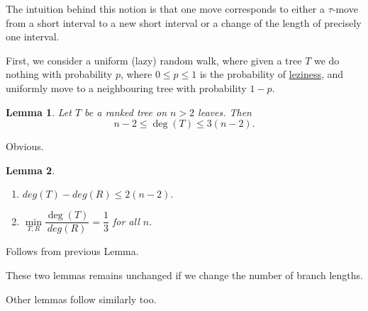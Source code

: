 \documentclass{amsart}
\newtheorem{lemma}{Lemma}
\begin{document}
The intuition behind this notion is that one move corresponds to either 
a $\tau$-move from a short interval to a new short interval or a change of the length of 
precisely one interval. 

First, we consider a uniform (lazy) random walk, where given a tree $T$ we do nothing 
with probability $p$, where $0\leq p\leq 1$ is the probability of \href{https://academichelp.net/wp-content/uploads/2014/01/laziness.jpg}{leziness}, and uniformly move to a neighbouring tree with probability $1-p$. 

\begin{lemma}
Let $T$ be a ranked tree on $n>2$ leaves. Then \[n-2\leq \deg(T)\leq3(n-2).\] 
\end{lemma}

\proof
Obvious.
\endproof

\begin{lemma}
\begin{enumerate}[(1)]
\item $deg(T)-deg(R) \leq 2(n-2).$
\item $\min\limits_{T,R}\dfrac{\deg(T)}{deg(R)} = \dfrac13$ for all $n.$
\end{enumerate}
\end{lemma}

\proof
Follows from previous Lemma. 
\endproof

These two lemmas remains unchanged if we change the number of branch lengths. 

Other lemmas follow similarly too. 
\end{document}
